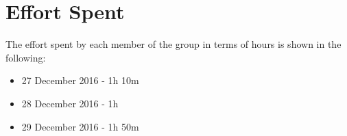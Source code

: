 \section{Effort Spent}

The effort spent by each member of the group in terms of hours is shown in the following:

\begin{itemize}
	\item 27 December 2016 - 1h 10m
	\item 28 December 2016 - 1h
	\item 29 December 2016 - 1h 50m
\end{itemize}
